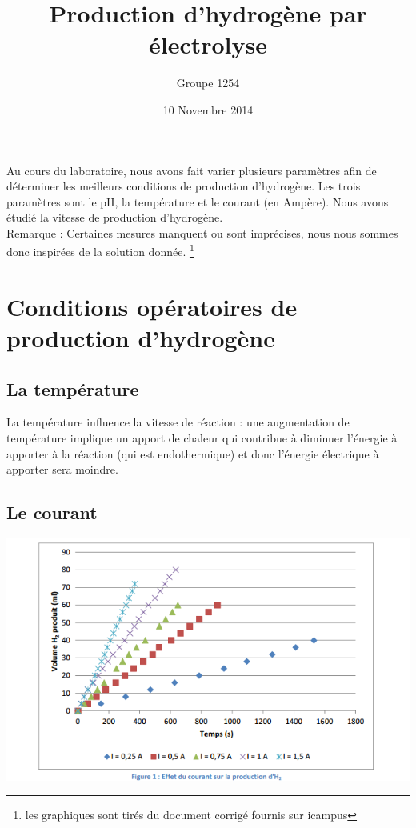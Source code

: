 \documentclass[10pt,a4paper]{article}
\title{Production d'hydrogène par électrolyse}
\author{Groupe 1254}
\date{10 Novembre 2014}
\begin{document}
\maketitle



Au cours du laboratoire, nous avons fait varier plusieurs paramètres afin de déterminer les meilleurs conditions de production d'hydrogène. Les trois paramètres sont le pH, la température et le courant (en Ampère). Nous avons étudié la vitesse de production d'hydrogène.
\\

Remarque : Certaines mesures manquent ou sont imprécises, nous nous sommes donc inspirées de la solution donnée. \footnote{les graphiques sont tirés du document corrigé fournis sur icampus}

\section{Conditions opératoires de production d'hydrogène}

\subsection{La température}

La température influence la vitesse de réaction : une augmentation de température implique un apport de chaleur qui contribue à diminuer l'énergie à apporter à la réaction (qui est endothermique) et donc l'énergie électrique à apporter sera moindre.



\subsection{Le courant}

\includegraphics[scale=0.6]{PRODUCTIONHYDRO.png} 
\\
  
\end{document}
